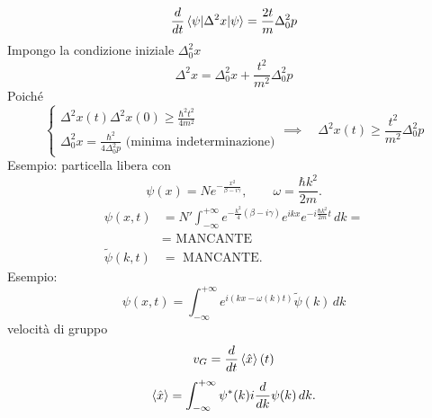 \[
\frac{d}{dt} \braket{\psi|\Delta^2 x|\psi} = \frac{2t}{m} \Delta_0^2 p 
\]
Impongo la condizione iniziale \( \Delta_0^2 x \)
\[
\Delta^2 x = \Delta_0^2 x + \frac{t^2}{m^2} \Delta_0^2 p
\]
Poiché
\[
\begin{cases}
\Delta^2 x(t) \Delta^2 x(0) \geq \frac{\hbar^2 t^2}{4m^2} \\
\Delta_0^2 x = \frac{\hbar^2}{4 \Delta_0^2 p} \text{ (minima indeterminazione)}
\end{cases} \implies \quad \Delta^2 x(t) \geq \frac{t^2}{m^2} \Delta_0^2 p
\]
Esempio: particella libera con 
\[
\psi(x) = N e^{-\frac{x^2}{\beta - i\gamma}}, \qquad \omega = \frac{\hbar k^2}{2m}.
\]
\begin{align*}
\psi(x, t) &= N' \int_{-\infty}^{+\infty} e^{-\frac{k^2}{4}(\beta - i\gamma)} e^{ikx} e^{-i\frac{\hbar k^2}{2m}t} \, dk = \\
&= \text{ MANCANTE} \\
\tilde{\psi}(k, t) &= \text{ MANCANTE}.
\end{align*}
Esempio:
\[
\psi(x, t) = \int_{-\infty}^{+\infty} e^{i(kx - \omega(k) t)} \tilde{\psi}(k) \, dk
\]
velocità di gruppo
\[
v_G = \frac{d}{dt} \braket{\hat{x}}(t)
\]
\[
\braket{\hat{x}} = \int_{-\infty}^{+\infty} \psi^*(k) i \frac{d}{dk} \psi(k) \, dk.
\]